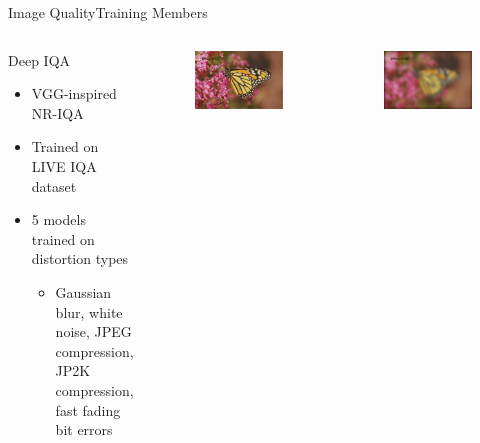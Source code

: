 \begin{frame}{Image Quality}{Training Members}
\begin{columns}
        \begin{block}{Deep IQA}
        \begin{itemize}
            \item VGG-inspired NR-IQA
            \item Trained on LIVE IQA dataset
            \item 5 models trained on distortion types
            \begin{itemize}
                \item Gaussian blur, white noise, JPEG compression, JP2K compression, fast fading bit errors
            \end{itemize}
        \end{itemize}
    \end{block}
        \begin{figure}
            \includegraphics[width=0.5 \textwidth]{figs/img173.pdf}
        \end{figure}
        \begin{figure}
            \includegraphics[width=0.5 \textwidth]{figs/img11.pdf}
        \end{figure}
    \end{columns}
\end{frame}

